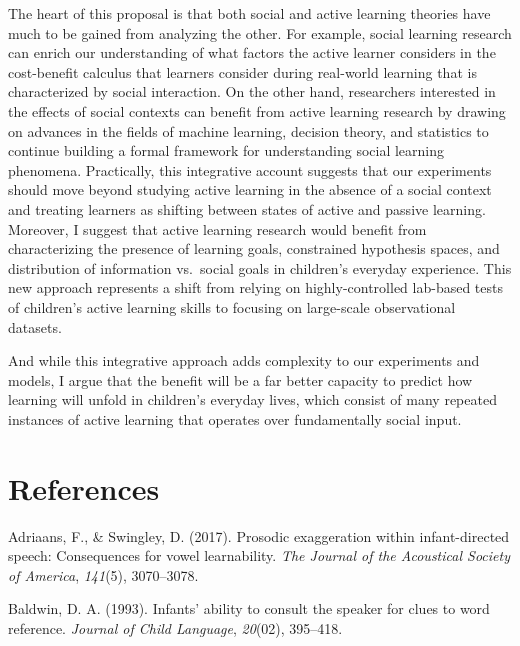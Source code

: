 \documentclass[english,floatsintext,man]{apa6}
\theoremstyle{definition}
\theoremstyle{definition}
\theoremstyle{definition}
\theoremstyle{remark}
\begin{document}
The heart of this proposal is that both social and active learning
theories have much to be gained from analyzing the other. For example,
social learning research can enrich our understanding of what factors
the active learner considers in the cost-benefit calculus that learners
consider during real-world learning that is characterized by social
interaction. On the other hand, researchers interested in the effects of
social contexts can benefit from active learning research by drawing on
advances in the fields of machine learning, decision theory, and
statistics to continue building a formal framework for understanding
social learning phenomena. Practically, this integrative account
suggests that our experiments should move beyond studying active
learning in the absence of a social context and treating learners as
shifting between states of active and passive learning. Moreover, I
suggest that active learning research would benefit from characterizing
the presence of learning goals, constrained hypothesis spaces, and
distribution of information vs.~social goals in children's everyday
experience. This new approach represents a shift from relying on
highly-controlled lab-based tests of children's active learning skills
to focusing on large-scale observational datasets.

And while this integrative approach adds complexity to our experiments
and models, I argue that the benefit will be a far better capacity to
predict how learning will unfold in children's everyday lives, which
consist of many repeated instances of active learning that operates over
fundamentally social input.

\newpage

\section{References}\label{references}

\setlength{\parindent}{-0.5in} \setlength{\leftskip}{0.5in}

\hypertarget{refs}{}
\hypertarget{ref-adriaans2017prosodic}{}
Adriaans, F., \& Swingley, D. (2017). Prosodic exaggeration within
infant-directed speech: Consequences for vowel learnability. \emph{The
Journal of the Acoustical Society of America}, \emph{141}(5),
3070--3078.

\hypertarget{ref-baldwin1993infants}{}
Baldwin, D. A. (1993). Infants' ability to consult the speaker for clues
to word reference. \emph{Journal of Child Language}, \emph{20}(02),
395--418.
\end{document}
